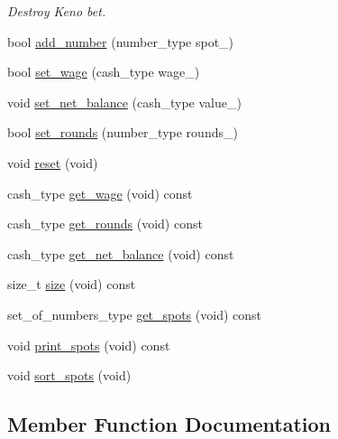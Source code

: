 \begin{DoxyCompactItemize}
\begin{DoxyCompactList}\small\item\em Destroy Keno bet. \end{DoxyCompactList}\item 
bool \hyperlink{classKenoBet_a670252422c82f61d89873e2917ab19ff}{add\+\_\+number} (number\+\_\+type spot\+\_\+)
\item 
bool \hyperlink{classKenoBet_ade3e0f73094137c791c22c51bdd9ce55}{set\+\_\+wage} (cash\+\_\+type wage\+\_\+)
\item 
void \hyperlink{classKenoBet_a8c75a2fc906904f3813d12c8d8bab206}{set\+\_\+net\+\_\+balance} (cash\+\_\+type value\+\_\+)
\item 
bool \hyperlink{classKenoBet_a513c7b942977a682d31c2242ca411fe4}{set\+\_\+rounds} (number\+\_\+type rounds\+\_\+)
\item 
void \hyperlink{classKenoBet_acc2afd4d502e44fdfbb122f3389bc633}{reset} (void)
\item 
cash\+\_\+type \hyperlink{classKenoBet_a154dce28288b205e6750f162da7808b5}{get\+\_\+wage} (void) const 
\item 
cash\+\_\+type \hyperlink{classKenoBet_a268383238c252c07f506614ff8999224}{get\+\_\+rounds} (void) const 
\item 
cash\+\_\+type \hyperlink{classKenoBet_a0da2e76674a36bf5849aa303584ccedb}{get\+\_\+net\+\_\+balance} (void) const 
\item 
size\+\_\+t \hyperlink{classKenoBet_a56733c32bd4fa67c2e2d028f814bc545}{size} (void) const 
\item 
set\+\_\+of\+\_\+numbers\+\_\+type \hyperlink{classKenoBet_a5771cea869177b33fae6498e8630dd9a}{get\+\_\+spots} (void) const 
\item 
void \hyperlink{classKenoBet_a0100ad317ea6ac529d450d8612a263a8}{print\+\_\+spots} (void) const 
\item 
void \hyperlink{classKenoBet_a220cd4de587db9919864e9605e4c1dfa}{sort\+\_\+spots} (void)
\end{DoxyCompactItemize}


\subsection{Member Function Documentation}
